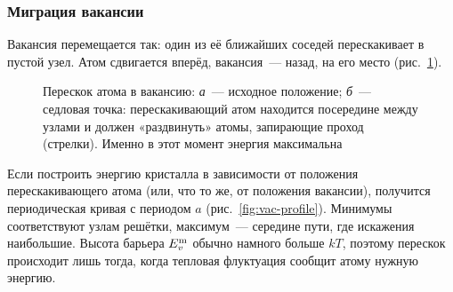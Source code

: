 \subsubsection{Миграция вакансии}

Вакансия перемещается так: один из её ближайших соседей перескакивает
в пустой узел. Атом сдвигается вперёд, вакансия~— назад, на его место
(рис.~\ref{fig:vac-jump}).

\begin{figure}[ht]
\centering
\begin{subfigure}[b]{0.42\textwidth}\centering
{}
\caption{}
\end{subfigure}
\begin{subfigure}[b]{0.42\textwidth}\centering
{}
\caption{}
\end{subfigure}
\caption{Перескок атома в вакансию: \textit{а}~— исходное положение;
\textit{б}~— седловая точка: перескакивающий атом находится посередине
между узлами и должен «раздвинуть» атомы, запирающие проход (стрелки).
Именно в этот момент энергия максимальна}
\label{fig:vac-jump}
\end{figure}

Если построить энергию кристалла в зависимости от положения
перескакивающего атома (или, что то же, от положения вакансии), получится
периодическая кривая с периодом $a$ (рис.~\ref{fig:vac-profile}).
Минимумы соответствуют узлам решётки, максимум~— середине пути, где
искажения наибольшие. Высота барьера $E_{v}^{\mathrm{m}}$ обычно намного больше $kT$,
поэтому перескок происходит лишь тогда, когда тепловая флуктуация сообщит
атому нужную энергию.

